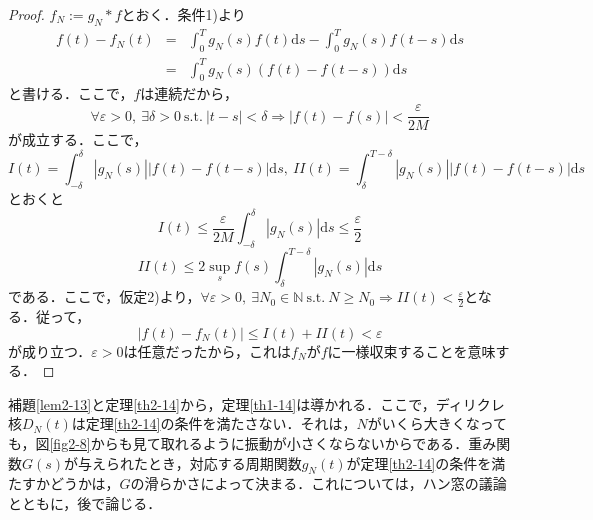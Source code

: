 \documentclass[a4j]{jsbook}
\numberwithin{theorem}{chapter}  %
\begin{document}
\begin{proof}
\(f_N:=g_N*f\)とおく．条件1)より
\begin{eqnarray*}
f(t)-f_N(t)&=&\int_0^T g_N(s)f(t)\mathrm{d}s-\int_0^T g_N(s)f(t-s)\mathrm{d}s \\
&=&\int_0^T g_N(s)(f(t)-f(t-s))\mathrm{d}s
\end{eqnarray*}
と書ける．ここで，\(f\)は連続だから，
\begin{equation*}
    \forall\varepsilon>0,\ \exists\delta>0\ \mathrm{s.t.}\ |t-s|<\delta\Rightarrow|f(t)-f(s)|<\frac{\varepsilon}{2M}
\end{equation*}
が成立する．ここで，
\begin{equation*}
    I(t)=\int_{-\delta}^\delta|g_N(s)||f(t)-f(t-s)|\mathrm{d}s,\ II(t)=\int_\delta^{T-\delta}|g_N(s)||f(t)-f(t-s)|\mathrm{d}s
\end{equation*}
とおくと
\begin{equation*}
    I(t)\leq\frac{\varepsilon}{2M}\int_{-\delta}^\delta|g_N(s)|\mathrm{d}s\leq\frac{\varepsilon}{2}
\end{equation*}
\begin{equation*}
    II(t)\leq 2\sup_s f(s)\int_\delta^{T-\delta}|g_N(s)|\mathrm{d}s
\end{equation*}
である．ここで，仮定2)より，\(\displaystyle \forall\varepsilon>0,\ \exists N_0\in\mathbb{N}\ \mathrm{s.t.}\ N\geq N_0\Rightarrow II(t)<\frac{\varepsilon}{2}\)となる．従って，
\begin{equation*}
    |f(t)-f_N(t)|\leq I(t)+II(t)<\varepsilon
\end{equation*}
が成り立つ．\(\varepsilon>0\)は任意だったから，これは\(f_N\)が\(f\)に一様収束することを意味する．
\end{proof}
補題\ref{lem2-13}と定理\ref{th2-14}から，定理\ref{th1-14}は導かれる．ここで，ディリクレ核\(D_N(t)\)は定理\ref{th2-14}の条件を満たさない．それは，\(N\)がいくら大きくなっても，図\ref{fig2-8}からも見て取れるように振動が小さくならないからである．重み関数\(G(s)\)が与えられたとき，対応する周期関数\(g_N(t)\)が定理\ref{th2-14}の条件を満たすかどうかは，\(G\)の滑らかさによって決まる．これについては，ハン窓の議論とともに，後で論じる．
\end{document}
